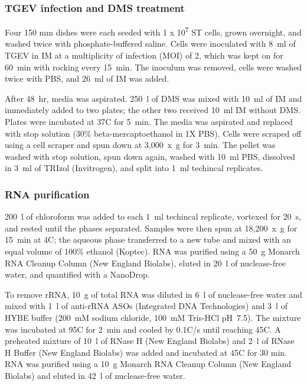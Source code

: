 \documentclass[main.tex]{subfiles}
\begin{document}
\subsubsection{TGEV infection and DMS treatment}

Four 150 mm dishes were each seeded with 1 x 10\textsuperscript{7} ST cells, grown overnight, and washed twice with phosphate-buffered saline.
Cells were inoculated with 8~ml of TGEV in IM at a multiplicity of infection (MOI) of 2, which was kept on for 60~min with rocking every 15~min.
The inoculum was removed, cells were washed twice with PBS, and 26~ml of IM was added.

After 48~hr, media was aspirated.
250~\textmu l of DMS was mixed with 10~ml of IM and immediately added to two plates; the other two received 10~ml IM without DMS.
Plates were incubated at 37\textdegree C for 5~min.
The media was aspirated and replaced with stop solution (30\% beta-mercaptoethanol in 1X PBS).
Cells were scraped off using a cell scraper and spun down at 3,000~x~g for 3~min.
The pellet was washed with stop solution, spun down again, washed with 10~ml PBS, dissolved in 3~ml of TRIzol (Invitrogen), and split into 1~ml techincal replicates.

\subsubsection{RNA purification}

200~\textmu l of chloroform was added to each 1~ml techincal replicate, vortexed for 20~s, and rested until the phases separated.
Samples were then spun at 18,200~x~g for 15~min at 4\textdegree C; the aqueous phase transferred to a new tube and mixed with an equal volume of 100\% ethanol (Koptec).
RNA was purified using a 50~\textmu g Monarch RNA Cleanup Column (New England Biolabs), eluted in 20~\textmu l of nuclease-free water, and quantified with a NanoDrop.

To remove rRNA, 10~\textmu g of total RNA was diluted in 6~\textmu l of nuclease-free water and mixed with 1~\textmu l of anti-rRNA ASOs (Integrated DNA Technologies) and 3~\textmu l of HYBE buffer (200~mM sodium chloride, 100~mM Tris-HCl pH~7.5).
The mixture was incubated at 95\textdegree C for 2~min and cooled by 0.1\textdegree C/s until reaching 45\textdegree C.
A preheated mixture of 10~\textmu l of RNase H (New England Biolabs) and 2~\textmu l of RNase H Buffer (New England Biolabs) was added and incubated at 45\textdegree C for 30 min.
RNA was purified using a 10~\textmu g Monarch RNA Cleanup Column (New England Biolabs) and eluted in 42~\textmu l of nuclease-free water.
\end{document}
